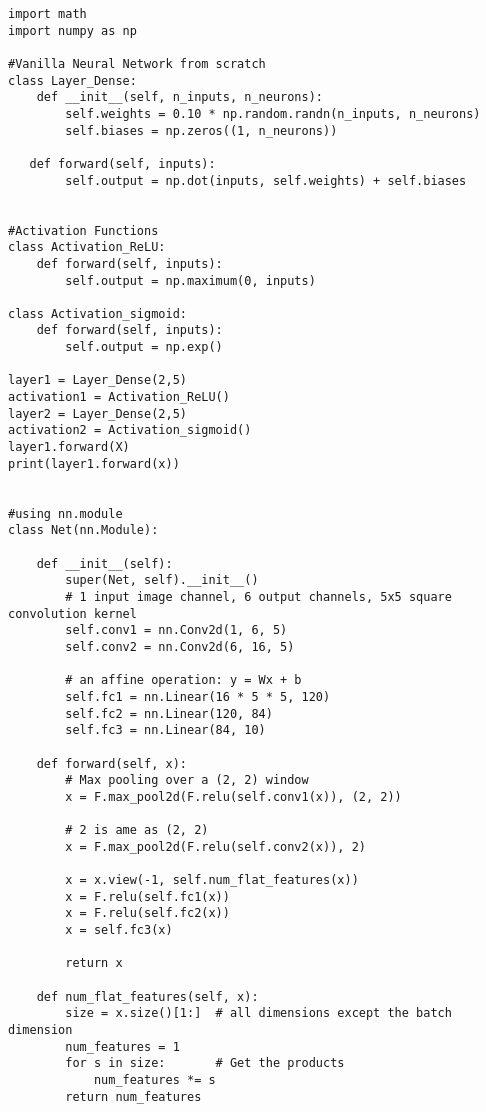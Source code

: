 \documentclass{article}
\begin{document}
\begin{lstlisting}
import math
import numpy as np

#Vanilla Neural Network from scratch
class Layer_Dense:
    def __init__(self, n_inputs, n_neurons):
        self.weights = 0.10 * np.random.randn(n_inputs, n_neurons)
        self.biases = np.zeros((1, n_neurons))

   def forward(self, inputs):
        self.output = np.dot(inputs, self.weights) + self.biases


#Activation Functions
class Activation_ReLU:
    def forward(self, inputs):
        self.output = np.maximum(0, inputs)

class Activation_sigmoid:
    def forward(self, inputs):
        self.output = np.exp()

layer1 = Layer_Dense(2,5)
activation1 = Activation_ReLU()
layer2 = Layer_Dense(2,5)
activation2 = Activation_sigmoid()
layer1.forward(X)
print(layer1.forward(x))


#using nn.module
class Net(nn.Module):

    def __init__(self):
        super(Net, self).__init__()
        # 1 input image channel, 6 output channels, 5x5 square convolution kernel
        self.conv1 = nn.Conv2d(1, 6, 5)
        self.conv2 = nn.Conv2d(6, 16, 5)

        # an affine operation: y = Wx + b
        self.fc1 = nn.Linear(16 * 5 * 5, 120)
        self.fc2 = nn.Linear(120, 84)
        self.fc3 = nn.Linear(84, 10)

    def forward(self, x):
        # Max pooling over a (2, 2) window
        x = F.max_pool2d(F.relu(self.conv1(x)), (2, 2))

        # 2 is ame as (2, 2)
        x = F.max_pool2d(F.relu(self.conv2(x)), 2)

        x = x.view(-1, self.num_flat_features(x))
        x = F.relu(self.fc1(x))
        x = F.relu(self.fc2(x))
        x = self.fc3(x)

        return x

    def num_flat_features(self, x):
        size = x.size()[1:]  # all dimensions except the batch dimension
        num_features = 1
        for s in size:       # Get the products
            num_features *= s
        return num_features
\end{lstlisting}

\clearpage
\end{document}
